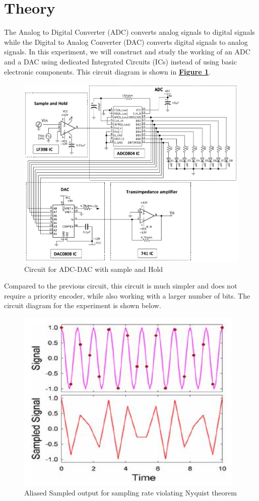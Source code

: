 \section{Theory}

	The Analog to Digital Converter (ADC) converts analog signals to digital signals while the Digital to Analog Converter (DAC) converts digital signals to analog signals. In this experiment, we will construct and study the working of an ADC and a DAC using dedicated Integrated Circuits (ICs) instead of using basic electronic components. This circuit diagram is shown in \hyperref[th:1]{\textbf{Figure 1}}.

	\begin{figure}[H]
		\centering
		\includegraphics[width=\columnwidth]{images/theory1.png}
		\caption{Circuit for ADC-DAC with sample and Hold}
		\label{th:1}
	\end{figure}

	Compared to the previous circuit, this circuit is much simpler and does not require a priority encoder, while also working with a larger number of bits. The circuit diagram for the experiment is shown below.

		\begin{figure}[H]
			\centering
			\includegraphics[width=0.6\columnwidth]{images/theory3.png}
			\caption{Aliased Sampled output for sampling rate violating Nyquist theorem}
			\label{th:2}
		\end{figure}

